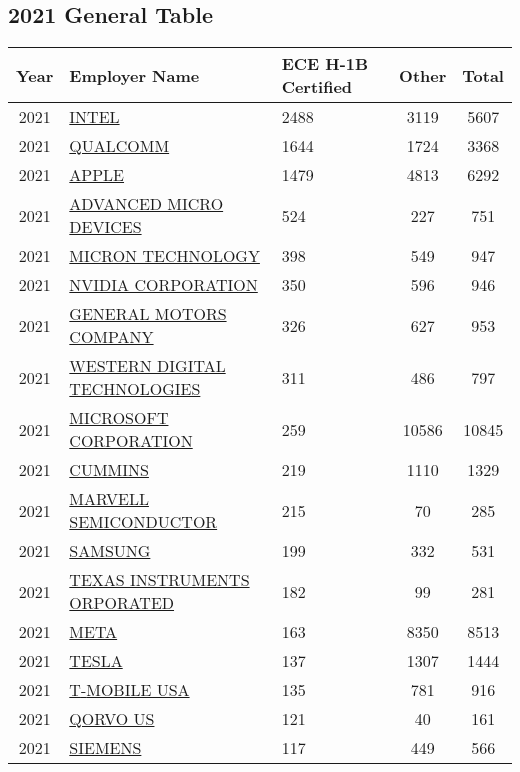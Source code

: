 \documentclass{article}%
\begin{document}
\subsection{2021 General Table}%
\label{subsec:2021GeneralTable}%
\begin{longtable}{c|p{20em}|p{5em}|c|c}%
\hline%
Year&Employer Name&ECE \newline%
 H{-}1B \newline%
 Certified&Other&Total\\%
\hline%
2021&\hyperref[subsec:INTEL]{INTEL}&2488&3119&5607\\%
\hline%
2021&\hyperref[subsec:QUALCOMM]{QUALCOMM}&1644&1724&3368\\%
\hline%
2021&\hyperref[subsec:APPLE]{APPLE}&1479&4813&6292\\%
\hline%
2021&\hyperref[subsec:ADVANCEDMICRODEVICES]{ADVANCED MICRO DEVICES}&524&227&751\\%
\hline%
2021&\hyperref[subsec:MICRONTECHNOLOGY]{MICRON TECHNOLOGY}&398&549&947\\%
\hline%
2021&\hyperref[subsec:NVIDIACORPORATION]{NVIDIA CORPORATION}&350&596&946\\%
\hline%
2021&\hyperref[subsec:GENERALMOTORSCOMPANY]{GENERAL MOTORS COMPANY}&326&627&953\\%
\hline%
2021&\hyperref[subsec:WESTERNDIGITALTECHNOLOGIES]{WESTERN DIGITAL TECHNOLOGIES}&311&486&797\\%
\hline%
2021&\hyperref[subsec:MICROSOFTCORPORATION]{MICROSOFT CORPORATION}&259&10586&10845\\%
\hline%
2021&\hyperref[subsec:CUMMINS]{CUMMINS}&219&1110&1329\\%
\hline%
2021&\hyperref[subsec:MARVELLSEMICONDUCTOR]{MARVELL SEMICONDUCTOR}&215&70&285\\%
\hline%
2021&\hyperref[subsec:SAMSUNG]{SAMSUNG}&199&332&531\\%
\hline%
2021&\hyperref[subsec:TEXASINSTRUMENTSORPORATED]{TEXAS INSTRUMENTS ORPORATED}&182&99&281\\%
\hline%
2021&\hyperref[subsec:META]{META}&163&8350&8513\\%
\hline%
2021&\hyperref[subsec:TESLA]{TESLA}&137&1307&1444\\%
\hline%
2021&\hyperref[subsec:T{-}MOBILEUSA]{T{-}MOBILE USA}&135&781&916\\%
\hline%
2021&\hyperref[subsec:QORVOUS]{QORVO US}&121&40&161\\%
\hline%
2021&\hyperref[subsec:SIEMENS]{SIEMENS}&117&449&566\\%

\end{longtable}
\end{document}
